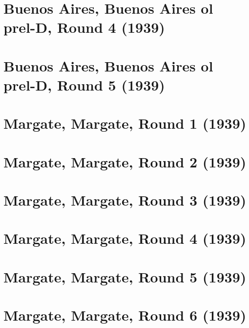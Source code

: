 \documentclass[11pt]{article}
\begin{document}
\clearpage

\section{Buenos Aires, Buenos Aires ol prel-D, Round 4 (1939)}


\clearpage

\section{Buenos Aires, Buenos Aires ol prel-D, Round 5 (1939)}


\clearpage

\section{Margate, Margate, Round 1 (1939)}


\clearpage

\section{Margate, Margate, Round 2 (1939)}


\clearpage

\section{Margate, Margate, Round 3 (1939)}


\clearpage

\section{Margate, Margate, Round 4 (1939)}


\clearpage

\section{Margate, Margate, Round 5 (1939)}


\clearpage

\section{Margate, Margate, Round 6 (1939)}

\end{document}
